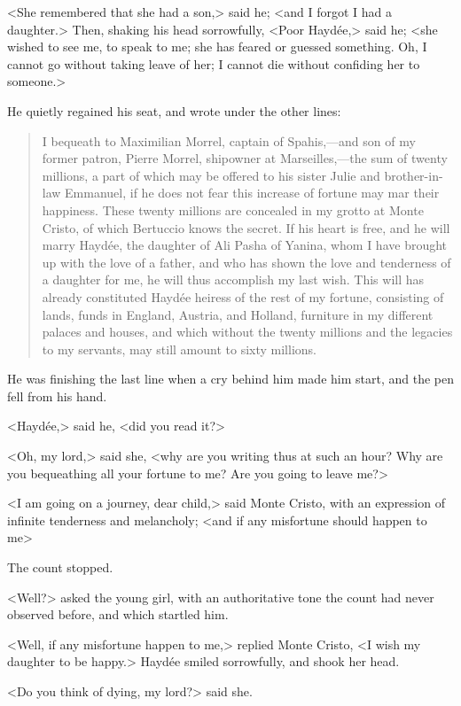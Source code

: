  <She remembered that she had a son,> said he; <and I forgot I had a daughter.> Then, shaking his head sorrowfully, <Poor Haydée,> said he; <she wished to see me, to speak to me; she has feared or guessed something. Oh, I cannot go without taking leave of her; I cannot die without confiding her to someone.> 

 He quietly regained his seat, and wrote under the other lines:  
 \begin{quote}
I bequeath to Maximilian Morrel, captain of Spahis,—and son of my former patron, Pierre Morrel, shipowner at Marseilles,—the sum of twenty millions, a part of which may be offered to his sister Julie and brother-in-law Emmanuel, if he does not fear this increase of fortune may mar their happiness. These twenty millions are concealed in my grotto at Monte Cristo, of which Bertuccio knows the secret. If his heart is free, and he will marry Haydée, the daughter of Ali Pasha of Yanina, whom I have brought up with the love of a father, and who has shown the love and tenderness of a daughter for me, he will thus accomplish my last wish. This will has already constituted Haydée heiress of the rest of my fortune, consisting of lands, funds in England, Austria, and Holland, furniture in my different palaces and houses, and which without the twenty millions and the legacies to my servants, may still amount to sixty millions.
\end{quote}

He was finishing the last line when a cry behind him made him start, and the pen fell from his hand. 

 <Haydée,> said he, <did you read it?> 

 <Oh, my lord,> said she, <why are you writing thus at such an hour? Why are you bequeathing all your fortune to me? Are you going to leave me?> 

 <I am going on a journey, dear child,> said Monte Cristo, with an expression of infinite tenderness and melancholy; <and if any misfortune should happen to me\longdash> 

 The count stopped. 

 <Well?> asked the young girl, with an authoritative tone the count had never observed before, and which startled him. 

 <Well, if any misfortune happen to me,> replied Monte Cristo, <I wish my daughter to be happy.> Haydée smiled sorrowfully, and shook her head. 

 <Do you think of dying, my lord?> said she. 


